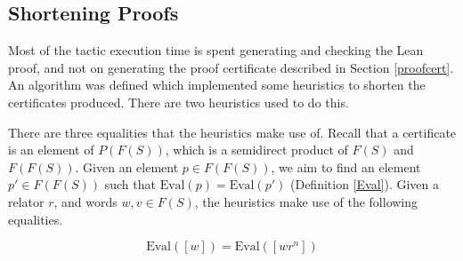 \documentclass[12pt]{article} %
\theoremstyle{definition}
\theoremstyle{definition}
\theoremstyle{definition}
\theoremstyle{definition}
\theoremstyle{definition}
\theoremstyle{definition}
\begin{document}




\subsection{Shortening Proofs}\label{golfsec}

Most of the tactic execution time is spent generating and checking the Lean proof,
and not on generating the proof certificate described in Section \ref{proofcert}.
An algorithm was defined which implemented some heuristics to shorten the certificates
produced. There are two heuristics used to do this.

There are three equalities that the heuristics make use of. Recall that
a certificate is an element of $P(F(S))$, which is a semidirect product of $F(S)$
and $F(F(S))$. Given an element $p \in F(F(S))$, we aim to find an element
$p' \in F(F(S))$ such that $\text{Eval}(p) = \text{Eval}(p')$ (Definition \ref{Eval}).
Given a relator $r$, and words $w, v \in F(S)$, the heuristics make use of the following equalities.

\begin{equation}\label{golf1}
  \text{Eval}([w]) = \text{Eval}([wr^n])
\end{equation}
\end{document}
